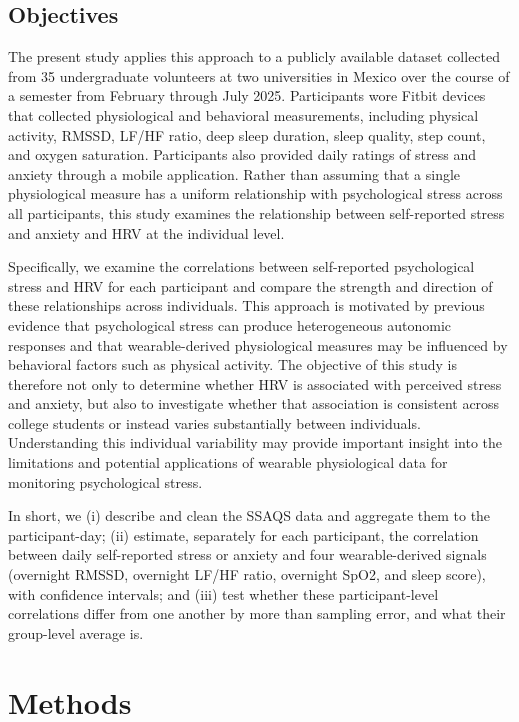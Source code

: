 \documentclass[11pt, a4paper, oneside]{article}
\begin{document}
\subsection{Objectives}
The present study applies this approach to a publicly available dataset collected from 35 undergraduate volunteers at two universities in Mexico over the course of a semester from February through July 2025. Participants wore Fitbit devices that collected physiological and behavioral measurements, including physical activity, RMSSD, LF/HF ratio, deep sleep duration, sleep quality, step count, and oxygen saturation. Participants also provided daily ratings of stress and anxiety through a mobile application. Rather than assuming that a single physiological measure has a uniform relationship with psychological stress across all participants, this study examines the relationship between self-reported stress and anxiety and HRV at the individual level.

Specifically, we examine the correlations between self-reported psychological stress and HRV for each participant and compare the strength and direction of these relationships across individuals. This approach is motivated by previous evidence that psychological stress can produce heterogeneous autonomic responses and that wearable-derived physiological measures may be influenced by behavioral factors such as physical activity. The objective of this study is therefore not only to determine whether HRV is associated with perceived stress and anxiety, but also to investigate whether that association is consistent across college students or instead varies substantially between individuals. Understanding this individual variability may provide important insight into the limitations and potential applications of wearable physiological data for monitoring psychological stress.

In short, we (i) describe and clean the SSAQS data and aggregate them to the participant-day; (ii) estimate, separately for each participant, the correlation between daily self-reported stress or anxiety and four wearable-derived signals (overnight RMSSD, overnight LF/HF ratio, overnight SpO2, and sleep score), with confidence intervals; and (iii) test whether these participant-level correlations differ from one another by more than sampling error, and what their group-level average is.

\section{Methods}
\end{document}
